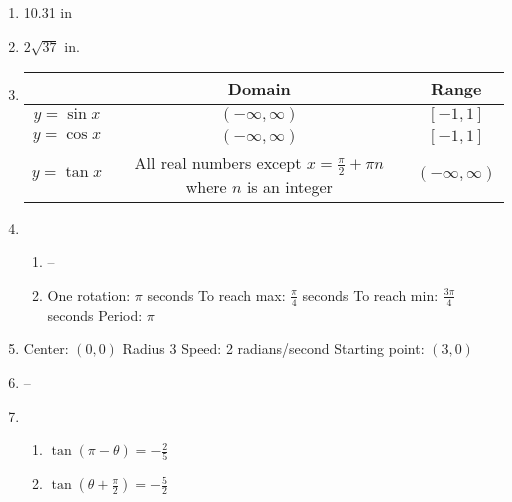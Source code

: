 \documentclass{article}
\begin{document}
\begin{enumerate}
\begin{enumerate}
	\end{enumerate}
	
\item 10.31 in

\item $2\sqrt{37}$ in.

\item

	\begin{tabular}{| c | c | c |}
	
	\hline
	& Domain & Range \\
	\hline
	$y = \sin{x}$ & $(-\infty, \infty)$ & $[-1,1]$ \\
	\hline
	$y = \cos{x}$ & $(-\infty, \infty)$ & $[-1, 1]$ \\
	\hline
	$y = \tan{x}$ & All real numbers except $x = \frac{\pi}{2} + \pi n$ where $n$ is an integer & $(-\infty, \infty)$ \\
	\hline
	
	\end{tabular}
	
\item 

	\begin{enumerate}
	
	\item -- 
	
	\item One rotation: $\pi$ seconds \newline
		To reach max: $\frac{\pi}{4}$ seconds \newline
		To reach min: $\frac{3\pi}{4}$ seconds \newline
		Period: $\pi$
	
	\end{enumerate}

\item Center: $(0,0)$ \newline
	Radius $3$ \newline
	Speed: 2 radians/second \newline
	Starting point: $(3,0)$

\item --

\item
	
	\begin{enumerate}
	
	\item $\tan{(\pi - \theta)} = -\frac{2}{5}$
	
	\item $\tan{(\theta + \frac{\pi}{2})} = -\frac{5}{2}$
	

\end{enumerate}
\end{enumerate}
\end{document}
